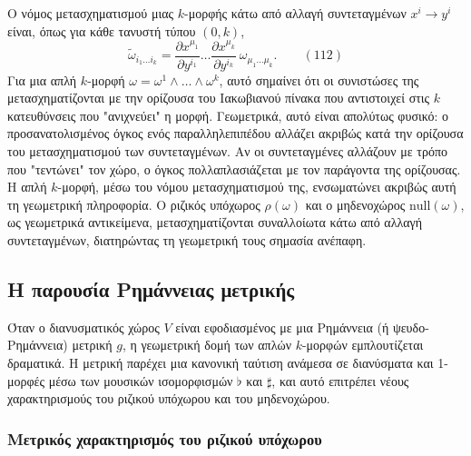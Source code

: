 \documentclass[12pt]{article}
\begin{document}
Ο νόμος μετασχηματισμού μιας $k$-μορφής κάτω από αλλαγή συντεταγμένων $x^i \to y^i$ είναι, όπως για κάθε τανυστή τύπου $(0,k)$,
\begin{equation}
\tilde{\omega}_{i_1 \dots i_k} = \frac{\partial x^{\mu_1}}{\partial y^{i_1}} \dots \frac{\partial x^{\mu_k}}{\partial y^{i_k}} \ \omega_{\mu_1 \dots \mu_k}. \qquad (112)
\end{equation}
Για μια απλή $k$-μορφή $\omega = \omega^1 \wedge \dots \wedge \omega^k$, αυτό σημαίνει ότι οι συνιστώσες της μετασχηματίζονται με την ορίζουσα του Ιακωβιανού πίνακα που αντιστοιχεί στις $k$ κατευθύνσεις που "ανιχνεύει" η μορφή. Γεωμετρικά, αυτό είναι απολύτως φυσικό: ο προσανατολισμένος όγκος ενός παραλληλεπιπέδου αλλάζει ακριβώς κατά την ορίζουσα του μετασχηματισμού των συντεταγμένων. Αν οι συντεταγμένες αλλάζουν με τρόπο που "τεντώνει" τον χώρο, ο όγκος πολλαπλασιάζεται με τον παράγοντα της ορίζουσας. Η απλή $k$-μορφή, μέσω του νόμου μετασχηματισμού της, ενσωματώνει ακριβώς αυτή τη γεωμετρική πληροφορία. Ο ριζικός υπόχωρος $\rho(\omega)$ και ο μηδενοχώρος $\text{null}(\omega)$, ως γεωμετρικά αντικείμενα, μετασχηματίζονται συναλλοίωτα κάτω από αλλαγή συντεταγμένων, διατηρώντας τη γεωμετρική τους σημασία ανέπαφη.

\subsection{Η παρουσία Ρημάννειας μετρικής}

Όταν ο διανυσματικός χώρος $V$ είναι εφοδιασμένος με μια Ρημάννεια (ή ψευδο-Ρημάννεια) μετρική $g$, η γεωμετρική δομή των απλών $k$-μορφών εμπλουτίζεται δραματικά. Η μετρική παρέχει μια κανονική ταύτιση ανάμεσα σε διανύσματα και 1-μορφές μέσω των μουσικών ισομορφισμών $\flat$ και $\sharp$, και αυτό επιτρέπει νέους χαρακτηρισμούς του ριζικού υπόχωρου και του μηδενοχώρου.

\subsubsection{Μετρικός χαρακτηρισμός του ριζικού υπόχωρου}
\end{document}
